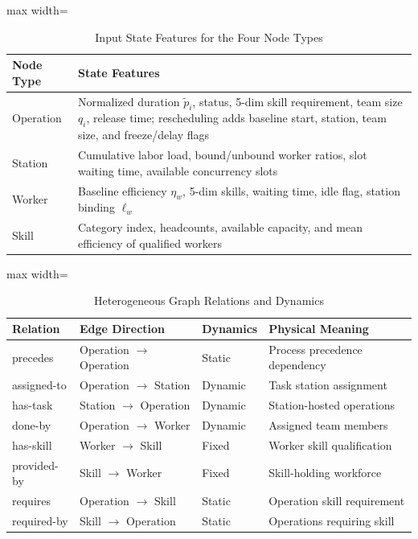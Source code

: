 \documentclass[journal,10pt]{IEEEtran}
\renewcommand{\arraystretch}{0.98}
\begin{document}
\begin{table}[!t]
\centering
\caption{Input State Features for the Four Node Types}
\label{tab:node_features}
\setlength{\tabcolsep}{3pt}
\renewcommand{\arraystretch}{0.98}
\begin{adjustbox}{max width=\columnwidth}
\begin{tabular}{@{}lp{6.8cm}@{}}
\toprule
\textbf{Node Type} & \textbf{State Features} \\
\midrule
Operation & Normalized duration $\widetilde p_i$, status, 5-dim skill requirement, team size $q_i$, release time; rescheduling adds baseline start, station, team size, and freeze/delay flags \\
Station & Cumulative labor load, bound/unbound worker ratios, slot waiting time, available concurrency slots \\
Worker & Baseline efficiency $\eta_w$, 5-dim skills, waiting time, idle flag, station binding $\ell_w$ \\
Skill & Category index, headcounts, available capacity, and mean efficiency of qualified workers \\
\bottomrule
\end{tabular}
\end{adjustbox}
\vspace{2pt}
\par{}\par
\end{table}

\begin{table}[!t]
\centering
\caption{Heterogeneous Graph Relations and Dynamics}
\label{tab:relations}
\setlength{\tabcolsep}{3pt}
\renewcommand{\arraystretch}{0.98}
\begin{adjustbox}{max width=\columnwidth}
\begin{tabular}{@{}llll@{}}
\toprule
\textbf{Relation} & \textbf{Edge Direction} & \textbf{Dynamics} & \textbf{Physical Meaning} \\
\midrule
precedes & Operation $\rightarrow$ Operation & Static & Process precedence dependency \\
assigned-to & Operation $\rightarrow$ Station & Dynamic & Task station assignment \\
has-task & Station $\rightarrow$ Operation & Dynamic & Station-hosted operations \\
done-by & Operation $\rightarrow$ Worker & Dynamic & Assigned team members \\
has-skill & Worker $\rightarrow$ Skill & Fixed & Worker skill qualification \\
provided-by & Skill $\rightarrow$ Worker & Fixed & Skill-holding workforce \\
requires & Operation $\rightarrow$ Skill & Static & Operation skill requirement \\
required-by & Skill $\rightarrow$ Operation & Static & Operations requiring skill \\
\bottomrule
\end{tabular}
\end{adjustbox}
\end{table}
\end{document}

